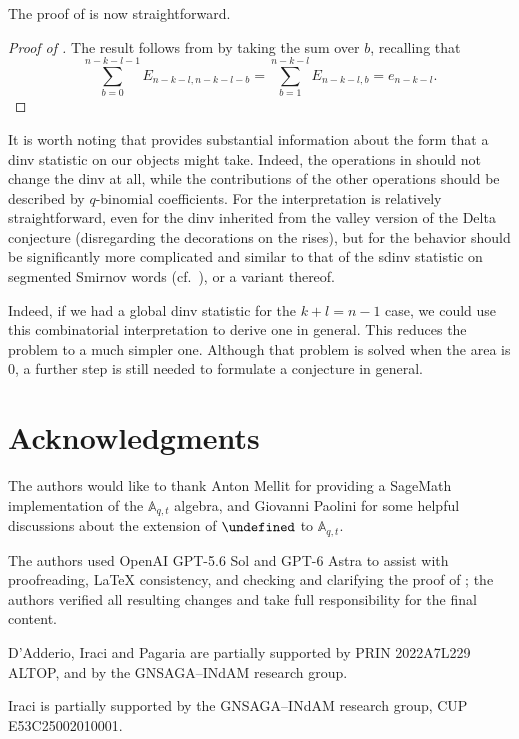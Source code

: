 \documentclass[reqno]{amsart}
\theoremstyle{plain}
\theoremstyle{definition}
\theoremstyle{remark}
\newcommand{\A}{\mathbb{A}}%
\let\oldTheta\Theta
\let\Theta\undefined
\DeclareMathOperator{\Theta}{\oldTheta}
\newcommand{\<}{\langle}
\renewcommand{\>}{\rangle}
\begin{document}
The proof of  is now straightforward.

\begin{proof}[Proof of ]
    The result follows from  by taking the sum over $b$, recalling that
    \[ \sum_{b=0}^{n-k-l-1} E_{n-k-l,n-k-l-b} = \sum_{b=1}^{n-k-l} E_{n-k-l,b} = e_{n-k-l}. \]
\end{proof}

It is worth noting that  provides substantial information about the form that a dinv statistic on our objects might take. Indeed, the operations in  should not change the dinv at all, while the contributions of the other operations should be described by $q$-binomial coefficients. For  the interpretation is relatively straightforward, even for the dinv inherited from the valley version of the Delta conjecture (disregarding the decorations on the rises), but for  the behavior should be significantly more complicated and similar to that of the sdinv statistic on segmented Smirnov words (cf.\ \cite[Lemma~3.7]{IraciNadeauVandenWyngaerd2024Smirnov}), or a variant thereof.

Indeed, if we had a global dinv statistic for the $k+l=n-1$ case, we could use this combinatorial interpretation to derive one in general. This reduces the problem to a much simpler one. Although that problem is solved when the area is $0$, a further step is still needed to formulate a conjecture in general.


\section{Acknowledgments}

The authors would like to thank Anton Mellit for providing a SageMath implementation of the $\A_{q,t}$ algebra, and Giovanni Paolini for some helpful discussions about the extension of $\Theta$ to $\A_{q,t}$.

The authors used OpenAI GPT-5.6 Sol and GPT-6 Astra to assist with proofreading, LaTeX consistency, and checking and clarifying the proof of ; the authors verified all resulting changes and take full responsibility for the final content.

D'Adderio, Iraci and Pagaria are partially supported by PRIN 2022A7L229 ALTOP, and by the GNSAGA--INdAM research group.

Iraci is partially supported by the GNSAGA--INdAM research group, CUP E53C25002010001.




\end{document}
